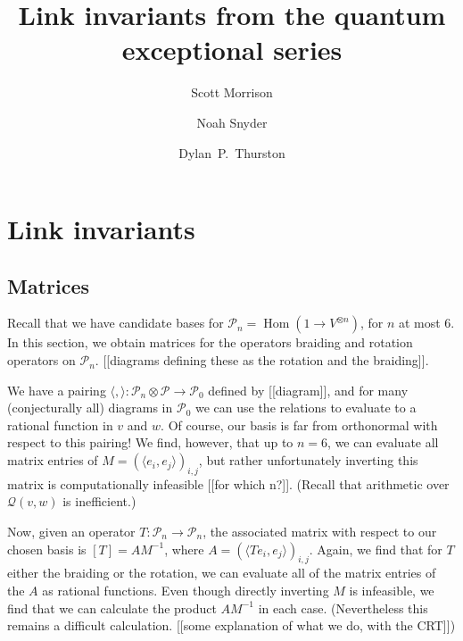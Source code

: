 \documentclass[12pt]{amsart}
\begin{document}
\title{Link invariants from the quantum exceptional series}

\author[Morrison]{Scott Morrison}
\address{Mathematical Sciences Institute, Australian National University}

\author[Snyder]{Noah Snyder}
\address{Bloomington, Indiana, USA}

\author[Thurston]{Dylan~P.~Thurston}
\address{Bloomington, Indiana, USA}

\maketitle

\newcommand{\V}{\mathcal{P}}
\newcommand{\nn}[1]{{\color{red}[[#1]]}}

\section{Link invariants}
\subsection{Matrices}
Recall that we have candidate bases for $\V_n = \operatorname{Hom}(1 \to V^{\otimes n})$, for $n$ at most 6.
In this section, we obtain matrices for the operators braiding and rotation operators on $\V_n$.
\nn{diagrams defining these as the rotation and the braiding}.

We have a pairing $\langle , \rangle: \V_n \otimes \V \to \V_0$ defined by \nn{diagram}, and for many 
(conjecturally all) diagrams in $\V_0$ we can use the relations to evaluate to a rational function 
in $v$ and $w$. Of course, our basis is far from orthonormal with respect to this pairing!
We find, however, that up to $n=6$, we can evaluate all matrix entries of
$M = \left(\langle e_i, e_j \rangle\right)_{i,j}$,
but rather unfortunately inverting this matrix is computationally infeasible \nn{for which n?}.
(Recall that arithmetic over $\mathcal{Q}(v,w)$ is inefficient.)

Now, given an operator $T: \V_n \to \V_n$, the associated matrix with respect to our chosen basis is
$[T] = AM^{-1}$, where $A = \left(\langle T e_i, e_j \rangle\right)_{i,j}$. Again, we find that for
$T$ either the braiding or the rotation, we can evaluate all of the matrix entries of the $A$ 
as rational functions. Even though directly inverting $M$ is infeasible, we find that we can
calculate the product $A M^{-1}$ in each case.
(Nevertheless this remains a difficult calculation. \nn{some explanation of what we do, with the CRT})
\end{document}
